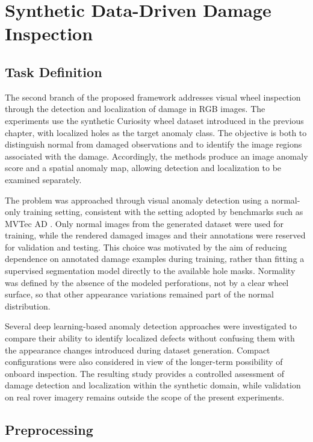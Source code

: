 \chapter{Synthetic Data-Driven Damage Inspection}

\section{Task Definition}
\label{sec:damage-task-definition}

The second branch of the proposed framework addresses visual wheel inspection through the detection and localization of damage in RGB images. The experiments use the synthetic Curiosity wheel dataset introduced in the previous chapter, with localized holes as the target anomaly class. The objective is both to distinguish normal from damaged observations and to identify the image regions associated with the damage. Accordingly, the methods produce an image anomaly score and a spatial anomaly map, allowing detection and localization to be examined separately.

The problem was approached through visual anomaly detection using a normal-only training setting, consistent with the setting adopted by benchmarks such as MVTec AD \cite{bergmann2019mvtec}. Only normal images from the generated dataset were used for training, while the rendered damaged images and their annotations were reserved for validation and testing. This choice was motivated by the aim of reducing dependence on annotated damage examples during training, rather than fitting a supervised segmentation model directly to the available hole masks. Normality was defined by the absence of the modeled perforations, not by a clear wheel surface, so that other appearance variations remained part of the normal distribution.

Several deep learning-based anomaly detection approaches were investigated to compare their ability to identify localized defects without confusing them with the appearance changes introduced during dataset generation. Compact configurations were also considered in view of the longer-term possibility of onboard inspection. The resulting study provides a controlled assessment of damage detection and localization within the synthetic domain, while validation on real rover imagery remains outside the scope of the present experiments.

\section{Preprocessing}
\label{sec:damage-preprocessing}

